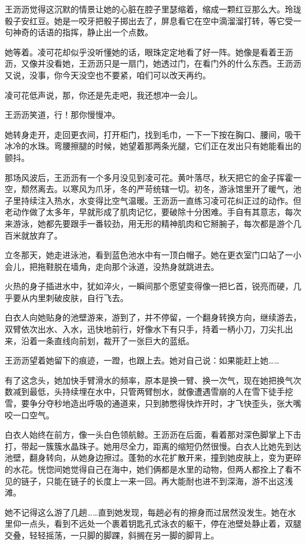 \documentclass[lang=cn,newtx,12pt,scheme=chinese]{elegantbook}
\begin{document}
王沥沥觉得这沉默的情景让她的心脏在腔子里瑟缩着，缩成一颗红豆那么大。玲珑骰子安红豆。她是一咬牙把骰子掷出去了，屏息看它在空中滴溜溜打转，等它受一句神奇的话语的指挥，静止出一个点数。

她等着。凌可花却似乎没听懂她的话，眼珠定定地看了好一阵。她像是看着王沥沥，又像并没看她，王沥沥只是一扇门，她透过门，在看门外的什么东西。王沥沥又说，没事，你今天没空也不要紧，咱们可以改天再约。

凌可花低声说，那，你还是先走吧，我还想冲一会儿。

王沥沥笑道，行！那你慢慢冲。

她转身走开，走回更衣间，打开柜门，找到毛巾，一下一下按在胸口、腰间，吸干冰冷的水珠。弯腰擦腿的时候，她望着那两条光腿，它们正在发出只有她能看出的颤抖。

那场风波后，王沥沥有一个多月没见到凌可花。黄叶落尽，秋天把它的金子挥霍一空，颓然离去。以寒风为爪牙，冬的严苛统辖一切。初冬，游泳馆里开了暖气，池子里持续注入热水，水变得比空气温暖。王沥沥一直练习凌可花纠正过的动作。但老动作做了太多年，早就形成了肌肉记忆，要破除十分困难。手自有其意志，每次来游泳，她都先要跟手一番较劲，用无形的精神肌肉和它掰腕子，每次都是游个几百米就放弃了。

立冬那天，她走进泳池，看到蓝色池水中有一顶白帽子。她在更衣室门口站了一小会儿，把拖鞋脱在墙角，走向那个泳道，没热身就跳进去。

火热的身子插进水中，犹如淬火，一瞬间那个愿望变得像一把匕首，锐亮而硬，几乎要从内里刺破皮肤，自行飞去。

白衣人向她贴身的池壁游来，游到了，并不停留，一个翻身转换方向，继续游去，双臂依次出水、入水，迅快地前行，好像水下有只手，持着一柄小刀，刀尖扎出来，沿着一条直线向前划，裁开了一张巨大的蓝纸。

王沥沥望着她留下的痕迹，一蹬，也跟上去。她对自己说：如果能赶上她……

有了这念头，她加快手臂滑水的频率，原本是换一臂、换一次气，现在她把换气次数减到最低，头持续埋在水中，只管两臂刨水，就像遭遇雪崩的人在雪下徒手挖雪，要争分夺秒地造出呼吸的通道来，只到肺憋得快炸开时，才飞快歪头，张大嘴咬一口空气。

白衣人始终在前方，像一头白色领航鲸。王沥沥在后面，看着那对深色脚掌上下击打，带起一簇簇水晶珠子。她用尽全力，距离的缩短仍然很慢。白衣人比她先到达池壁，翻身转向，从她身边擦过。蓬勃的水花扩散开来，撞到她皮肤上，变为更碎的水花。恍惚间她觉得自己在海中，她们俩都是水里的动物，但两人都拴上了看不见的链子，只能在链子的长度上一来一回。再大能耐也进不到深海，游不出这浅滩。

她不记得这么游了几趟……直到她发现，每趟必有的擦身而过居然没发生。她在水里仰一点头，看到不远处一个裹着钥匙孔式泳衣的躯干，停在池壁处静止着，双腿交叠，轻轻摇荡，一只脚的脚踝，斜搁在另一脚的脚背上。
\end{document}
